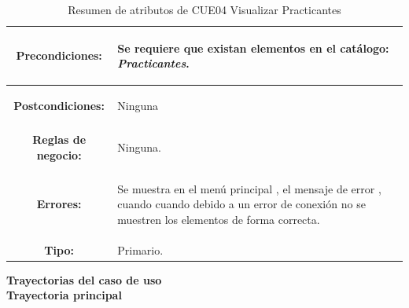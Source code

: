 \begin{table}[H]
\begin{tabular}{| c | p{12 cm} |}
\hline
\textbf{Precondiciones:} & \vspace{-2mm}	%
							\begin{compactitem}
								\setlength\itemsep{-0.25em}
								\item Se requiere que existan elementos en el catálogo: \textit{Practicantes}.
							\end{compactitem}\\
\hline
\textbf{Postcondiciones:} & \vspace{-2mm}	%
							\begin{compactitem}
								\item Ninguna
							\end{compactitem}\\
\hline
\textbf{Reglas de negocio:} & \vspace{-2mm}	%
							\begin{compactitem}
								\item Ninguna.
							\end{compactitem}\\							
\hline
\textbf{Errores:} & \vspace{-2mm}	%
					\begin{compactitem}
						\setlength\itemsep{-0.25em}
						\item  Se muestra en el menú principal \nameref{menu:ME02}, el mensaje de error \nameref{msj:MSG24}, cuando cuando debido a un error de conexión no se muestren los elementos de forma correcta.
					\end{compactitem}\\
\hline
\textbf{Tipo:} & Primario.\\
\hline	
\end{tabular}
\caption{Resumen de atributos de CUE04 Visualizar Practicantes}
\label{tab:CUE04}
\end{table} 

\textbf{\textcolor[rgb]{0, 0, 0.545098}{Trayectorias del caso de uso}} \\

\textbf{\large{Trayectoria principal}}

